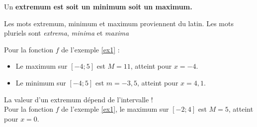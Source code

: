 \documentclass[10pt,a4paper,openany,twoside, eleve]{book}
\begin{document}
	\begin{rem}{}{}
		Un \bf{extremum} est soit un minimum soit un maximum.

		Les mots extremum, minimum et maximum proviennent du latin. Les mots pluriels sont \emph{extrema}, \emph{minima} et \emph{maxima}
	\end{rem}
	\begin{ex}{}{}
		Pour la fonction $f$ de l'exemple \ref{ex1} :
		\begin{itemize}
			\item  Le maximum sur $[-4;5]$ est $M=11$, atteint pour $x=-4$.
			\item  Le minimum sur $[-4;5]$ est $m=-3,5$, atteint pour $x=4,1$.
		\end{itemize}
	\end{ex}

	\begin{rem}{}{}
		La valeur d'un extremum dépend de l'intervalle !\\
		Pour la fonction $f$ de l'exemple \ref{ex1}, le maximum sur $[-2;4]$ est $M=5$, atteint pour $x=0$.
	\end{rem}
\end{document}
